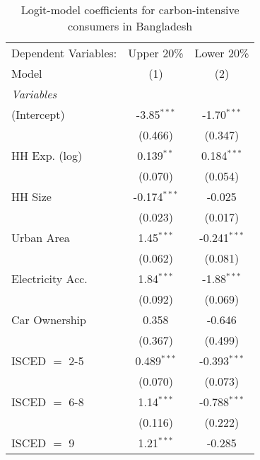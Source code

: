 
\begin{table}[htbp!]
   \centering
   \small
   \begin{adjustbox}{width = 1\textwidth, max height = 0.95\textheight, center}
      \begin{threeparttable}[b]
         \caption{\label{tab:Logit_1_BGD} Logit-model coefficients for carbon-intensive consumers in Bangladesh}
         \begin{tabular}{lcc}
            \tabularnewline \midrule \midrule
            Dependent Variables: & Upper 20\%     & Lower 20\%\\   
            Model                & (1)            & (2)\\  
            \midrule
            \emph{Variables}\\
            (Intercept)          & -3.85$^{***}$  & -1.70$^{***}$\\   
                                 & (0.466)        & (0.347)\\   
            HH Exp. (log)        & 0.139$^{**}$   & 0.184$^{***}$\\   
                                 & (0.070)        & (0.054)\\   
            HH Size              & -0.174$^{***}$ & -0.025\\   
                                 & (0.023)        & (0.017)\\   
            Urban Area           & 1.45$^{***}$   & -0.241$^{***}$\\   
                                 & (0.062)        & (0.081)\\   
            Electricity Acc.     & 1.84$^{***}$   & -1.88$^{***}$\\   
                                 & (0.092)        & (0.069)\\   
            Car Ownership        & 0.358          & -0.646\\   
                                 & (0.367)        & (0.499)\\   
            ISCED $=$ 2-5        & 0.489$^{***}$  & -0.393$^{***}$\\   
                                 & (0.070)        & (0.073)\\   
            ISCED $=$ 6-8        & 1.14$^{***}$   & -0.788$^{***}$\\   
                                 & (0.116)        & (0.222)\\   
            ISCED $=$ 9          & 1.21$^{***}$   & -0.285\\   

\end{tabular}
\end{threeparttable}
\end{adjustbox}
\end{table}
